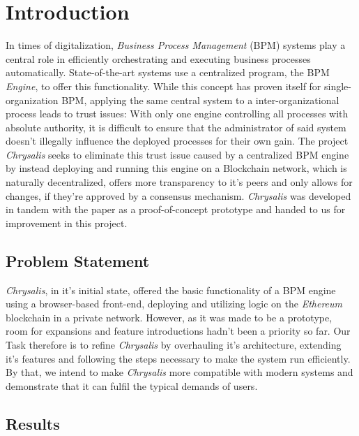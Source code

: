%
\chapter{Introduction}
\label{sec:intro}


In times of digitalization, \emph{Business Process Management} (BPM) systems play a central role in efficiently orchestrating and executing business processes automatically. State-of-the-art systems use a centralized program, the BPM \emph{Engine}, to offer this functionality. While this concept has proven itself for single-organization BPM, applying the same central system to a inter-organizational process leads to trust issues: With only one engine controlling all processes with absolute authority, it is difficult to ensure that the administrator of said system doesn't illegally influence the deployed processes for their own gain. \newline 
 The project \emph{Chrysalis} seeks to eliminate this trust issue caused by a centralized BPM engine by instead deploying and running this engine on a Blockchain network, which is naturally decentralized, offers more transparency to it's peers and only allows for changes, if they're approved by a consensus mechanism. \newline
 \emph{Chrysalis} was developed in tandem with the paper \cite{chrysalis} as a proof-of-concept prototype and handed to us for improvement in this project.


\section{Problem Statement}
\label{sec:intro:problem}

\emph{Chrysalis}, in it's initial state, offered the basic functionality of a BPM engine using a browser-based front-end, deploying and utilizing logic on the \emph{Ethereum} blockchain in a private network. However, as it was made to be a prototype, room for expansions and feature introductions hadn't been a priority so far. \newline
Our Task therefore is to refine \emph{Chrysalis} by overhauling it's architecture, extending it's features and following the steps necessary to make the system run efficiently. By that, we intend to make \emph{Chrysalis} more compatible with modern systems and demonstrate that it can fulfil the typical demands of users. \newline

\section{Results}
\label{sec:intro:results}

